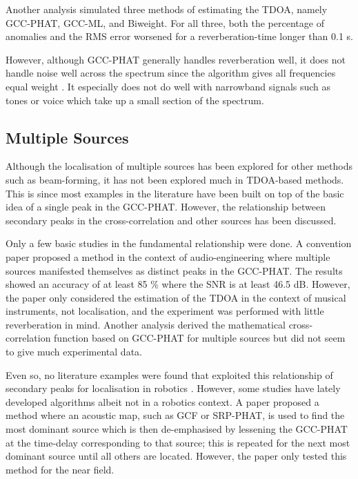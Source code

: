 \documentclass[notitlepage]{report}
\begin{document}
Another analysis \cite{brandstein_robust_1997} simulated three methods of estimating the TDOA, namely GCC-PHAT, GCC-ML, and Biweight. For all three, both the percentage of anomalies and the RMS error worsened for a reverberation-time longer than 0.1 \si{s}.

However, although GCC-PHAT generally handles reverberation well, it does not handle noise well across the spectrum since the algorithm gives all frequencies equal weight \cite{valin_robust_2003}. It especially does not do well with narrowband signals such as tones or voice which take up a small section of the spectrum.

\subsection{Multiple Sources}

Although the localisation of multiple sources has been explored for other methods such as beam-forming, it has not been explored much in TDOA-based methods. This is since most examples in the literature have been built on top of the basic idea of a single peak in the GCC-PHAT. However, the relationship between secondary peaks in the cross-correlation and other sources has been discussed.

Only a few basic studies in the fundamental relationship were done. A convention paper \cite{clifford_calculating_2010} proposed a method in the context of audio-engineering where multiple sources manifested themselves as distinct peaks in the GCC-PHAT. The results showed an accuracy of at least 85 \% where the SNR is at least 46.5 \si{dB}. However, the paper only considered the estimation of the TDOA in the context of musical instruments, not localisation, and the experiment was performed with little reverberation in mind. Another analysis \cite{kwon_analysis_2010} derived the mathematical cross-correlation function based on GCC-PHAT for multiple sources but did not seem to give much experimental data. 

Even so, no literature examples were found that exploited this relationship of secondary peaks for localisation in robotics \cite{rascon_localization_2017}. However, some studies have lately developed algorithms albeit not in a robotics context. A paper \cite{brutti_multiple_2010} proposed a method where an acoustic map, such as GCF or SRP-PHAT, is used to find the most dominant source which is then de-emphasised by lessening the GCC-PHAT at the time-delay corresponding to that source; this is repeated for the next most dominant source until all others are located. However, the paper only tested this method for the near field.
\end{document}

